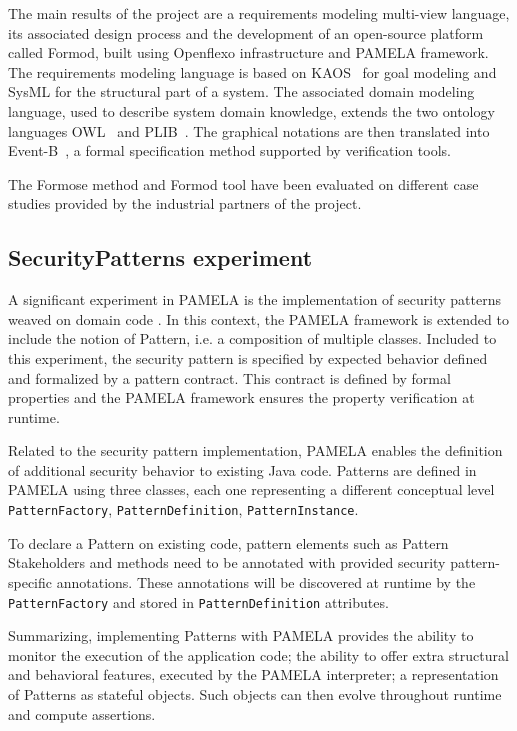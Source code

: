 The main results of the project are a requirements modeling multi-view
language, its associated design process and the development of an open-source
platform called Formod\cite{FormodWebSite}, built using Openflexo
infrastructure and PAMELA framework. %
The requirements modeling language is based on KAOS~\cite{kaos} for goal
modeling and SysML for the structural part of a system. The associated domain
modeling language, used to describe system domain knowledge, extends the two
ontology languages OWL~\cite{owl} and PLIB~\cite{plib}. The graphical notations
are then translated into Event-B~\cite{eventb}, a formal specification method supported by verification tools. 


The Formose method and Formod tool have been evaluated on different case studies provided by the industrial partners of the project.



\subsection{SecurityPatterns experiment}

A significant experiment in PAMELA is the implementation of security patterns weaved on domain code \cite{silva20}.
In this context, the PAMELA framework is extended to include the notion of Pattern, i.e. a composition of multiple classes. Included to this experiment, the security pattern is specified by expected behavior defined and formalized by a pattern contract. This contract is defined by formal properties and the PAMELA framework ensures the property verification at runtime.

Related to the security pattern implementation, PAMELA enables the definition of additional security behavior to existing Java code.
Patterns are defined in PAMELA using three classes, each one representing a different conceptual level \texttt{PatternFactory}, \texttt{PatternDefinition}, \texttt{PatternInstance}.

To declare a Pattern on existing code, pattern elements such as Pattern Stakeholders and methods need to be annotated with provided security pattern-specific annotations. These annotations will be discovered at runtime by the \texttt{PatternFactory} and stored in \texttt{PatternDefinition} attributes.


Summarizing, implementing Patterns with PAMELA provides the ability to monitor the execution of the application code; the ability to offer extra structural and behavioral features, executed by the PAMELA interpreter; a representation of Patterns as stateful objects. Such objects can then evolve throughout runtime and compute assertions.








